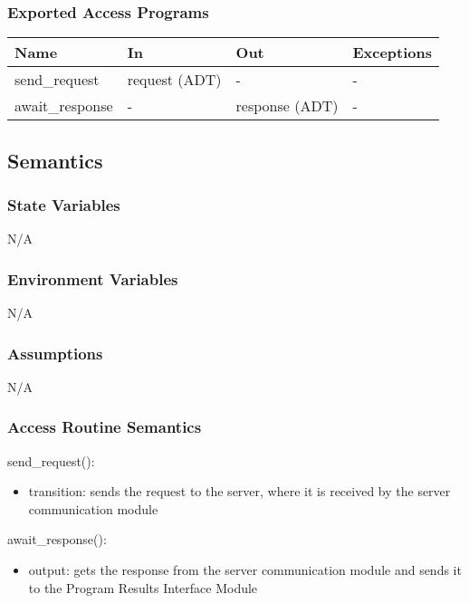 \documentclass[12pt, titlepage]{article}
\begin{document}
\subsubsection{Exported Access Programs}

\begin{center}
\begin{tabular}{p{3cm} p{5cm} p{3cm} p{2cm}}
\hline
\textbf{Name} & \textbf{In} & \textbf{Out} & \textbf{Exceptions}\\
\hline%
send\_request & request (ADT) &- &-\\
await\_response &- &response (ADT) &-\\
\hline
\end{tabular}
\end{center}

\subsection{Semantics}

\subsubsection{State Variables}
N/A

\subsubsection{Environment Variables}
N/A

\subsubsection{Assumptions}
N/A

\subsubsection{Access Routine Semantics}

\noindent send\_request():
\begin{itemize}
\item transition: sends the request to the server, where it is received by the server communication module 
\end{itemize}

\noindent await\_response():
\begin{itemize} 
  \item output: gets the response from the server communication module and sends it to the Program Results Interface Module  
\end{itemize}
\end{document}
